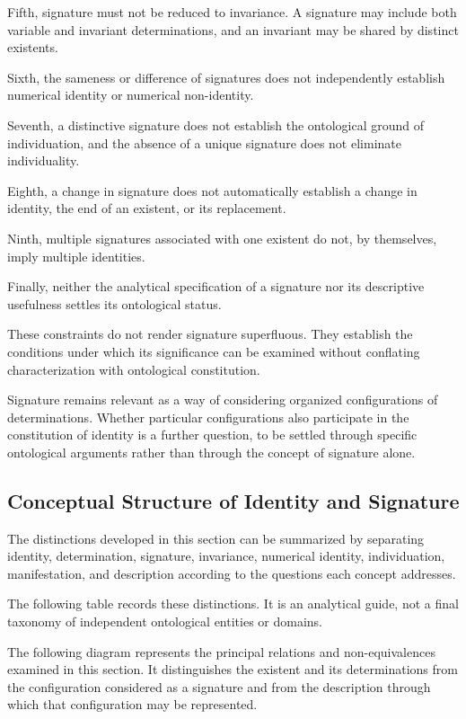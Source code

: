 Fifth, signature must not be reduced to invariance.
A signature may include both variable and
invariant determinations, and an invariant may
be shared by distinct existents.

Sixth, the sameness or difference of signatures
does not independently establish numerical
identity or numerical non-identity.

Seventh, a distinctive signature does not
establish the ontological ground of individuation,
and the absence of a unique signature does
not eliminate individuality.

Eighth, a change in signature does not
automatically establish a change in identity,
the end of an existent, or its replacement.

Ninth, multiple signatures associated with
one existent do not, by themselves, imply
multiple identities.

Finally, neither the analytical specification
of a signature nor its descriptive usefulness
settles its ontological status.

These constraints do not render signature
superfluous. They establish the conditions
under which its significance can be examined
without conflating characterization with
ontological constitution.

Signature remains relevant as a way of
considering organized configurations of
determinations. Whether particular configurations
also participate in the constitution of identity
is a further question, to be settled through
specific ontological arguments rather than
through the concept of signature alone.

\subsection{Conceptual Structure of Identity and Signature}

The distinctions developed in this section
can be summarized by separating identity,
determination, signature, invariance, numerical
identity, individuation, manifestation, and
description according to the questions each
concept addresses.

The following table records these distinctions.
It is an analytical guide, not a final taxonomy
of independent ontological entities or domains.



The following diagram represents the principal
relations and non-equivalences examined in
this section. It distinguishes the existent
and its determinations from the configuration
considered as a signature and from the
description through which that configuration
may be represented.

